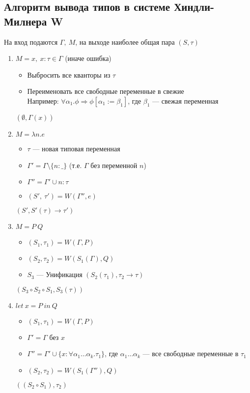 \subsection{Алгоритм вывода типов в системе Хиндли-Милнера W}
На вход подаются $\Gamma,\ M$, на выходе наиболее общая пара $(S, \tau)$
\begin{enumerate}
    \item $M = x ,\ x:\tau  \in \Gamma$ (иначе ошибка)
    \begin{itemize}
        \item Выбросить все кванторы из $\tau$
        \item Переименовать все свободные переменные в свежие \\
        Например: $\forall \alpha_1.\phi \Rightarrow \phi[\alpha_1 := \beta_1]$, где $\beta_1$ --- свежая переменная
    \end{itemize}
    $(\emptyset, \Gamma(x))$
    \item $M = \lambda n.e$
    \begin{itemize}
        \item $\tau$ --- новая типовая переменная
        \item $\Gamma' = \Gamma \setminus \{n : \_ \}$ (т.е. $\Gamma$ без переменной $n$)
        \item $\Gamma'' = \Gamma' \cup {n : \tau}$
        \item $(S',\ \tau') = W(\Gamma'', e)$
    \end{itemize}
    $(S', S'(\tau) \rightarrow \tau')$
    \item $M = P\ Q$
    \begin{itemize}
        \item $(S_1, \tau_1) = W(\Gamma, P)$
        \item $(S_2, \tau_2) = W(S_1(\Gamma), Q)$
        \item $S_3$ --- Унификация $(S_2(\tau_1), \tau_2 \rightarrow \tau)$
    \end{itemize}
    $(S_3 \circ S_2 \circ S_1, S_3(\tau))$
    \item $let\ x = P\ in\ Q$
    \begin{itemize}
        \item $(S_1, \tau_1) = W(\Gamma, P)$
        \item $\Gamma' = \Gamma$ без $x$
        \item $\Gamma'' = \Gamma' \cup \{ x : \forall \alpha_1 \dots \alpha_k. \tau_1 \}$, где $\alpha_1 \dots \alpha_k$ --- все свободные переменные в $\tau_1$
        \item $(S_2, \tau_2) = W(S_1(\Gamma''), Q)$
    \end{itemize}
    $((S_2 \circ S_1), \tau_2)$
\end{enumerate}


